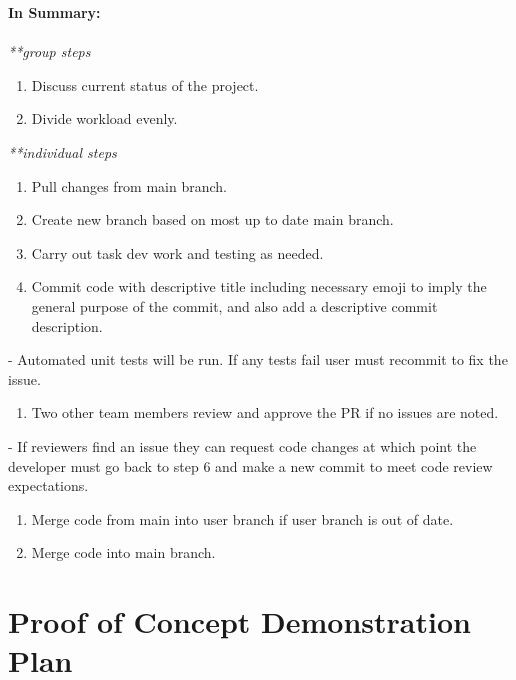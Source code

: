 \documentclass{article}
\begin{document}
\textbf{In Summary:}\\ \\
\textit{**group steps}
\begin{enumerate}[resume]
  \item Discuss current status of the project.
  \item Divide workload evenly.
  \end{enumerate}
\textit{**individual steps}
\begin{enumerate}[resume]
  \item Pull changes from main branch.
  \item Create new branch based on most up to date main branch.
  \item Carry out task dev work and testing as needed.
  \item Commit code with descriptive title including necessary emoji to imply the general purpose of the commit, and also add a descriptive commit description.
  \end{enumerate}
  \begin{adjustwidth}{1.3cm}{0cm}
  - Automated unit tests will be run. If any tests fail user must recommit to fix the issue.
  \end{adjustwidth}
\begin{enumerate}[resume]
  \item Two other team members review and approve the PR if no issues are noted.
  \end{enumerate}
  \begin{adjustwidth}{1.3cm}{0cm}
  - If reviewers find an issue they can request code changes at which point the developer must go back to step 6 and make a new commit to meet code review expectations.
  \end{adjustwidth}
\begin{enumerate}[resume]
  \item Merge code from main into user branch if user branch is out of date.
  \item Merge code into main branch.
\end{enumerate}

\newpage
\section{Proof of Concept Demonstration Plan}
\end{document}
